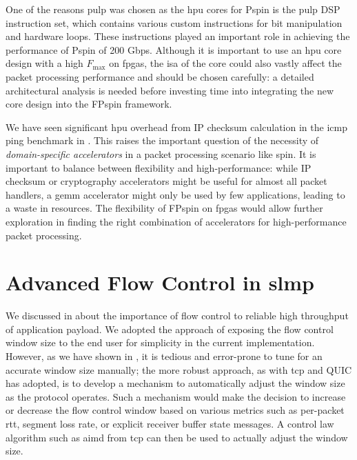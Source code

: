 One of the reasons \ac{pulp} was chosen as the \ac{hpu} cores for P\acs{spin} is the \ac{pulp} DSP instruction set, which contains various custom instructions for bit manipulation and hardware loops.  These instructions played an important role in achieving the performance of P\ac{spin} of 200 Gbps.   Although it is important to use an \ac{hpu} core design with a high $F_\text{max}$ on \ac{fpga}s, the \ac{isa} of the core could also vastly affect the packet processing performance and should be chosen carefully: a detailed architectural analysis is needed before investing time into integrating the new core design into the FP\acs{spin} framework.

We have seen significant \ac{hpu} overhead from IP checksum calculation in the \ac{icmp} ping benchmark in .  This raises the important question of the necessity of \emph{domain-specific accelerators} in a packet processing scenario like \ac{spin}.  It is important to balance between flexibility and high-performance: while IP checksum or cryptography accelerators might be useful for almost all packet handlers, a \ac{gemm} accelerator might only be used by few applications, leading to a waste in resources.  The flexibility of FP\acs{spin} on \ac{fpga}s would allow further exploration in finding the right combination of accelerators for high-performance packet processing.

\section{Advanced Flow Control in \acs{slmp}} \label{sec:slmp-fc-future-work}

We discussed in  about the importance of flow control to reliable high throughput of application payload.  We adopted the approach of exposing the flow control window size to the end user for simplicity in the current implementation.  However, as we have shown in , it is tedious and error-prone to tune for an accurate window size manually; the more robust approach, as with \ac{tcp} and QUIC has adopted, is to develop a mechanism to automatically adjust the window size as the protocol operates.  Such a mechanism would make the decision to increase or decrease the flow control window based on various metrics such as per-packet \ac{rtt}, segment loss rate, or explicit receiver buffer state messages.  A control law algorithm such as \ac{aimd} from \ac{tcp} can then be used to actually adjust the window size.

